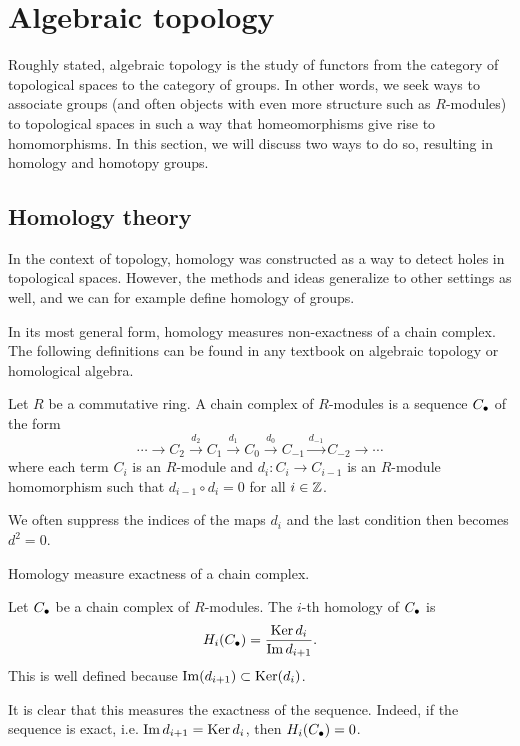 \section*{Algebraic topology}

Roughly stated, algebraic topology is the study of functors from the category of topological spaces to the category of groups.
In other words, we seek ways to associate groups (and often objects with even more structure such as $R$-modules) to topological spaces in such a way that homeomorphisms give rise to homomorphisms.
In this section, we will discuss two ways to do so, resulting in homology and homotopy groups.

\subsection*{Homology theory}

In the context of topology, homology was constructed as a way to detect holes in topological spaces.
However, the methods and ideas generalize to other settings as well, and we can for example define homology of groups.

In its most general form, homology measures non-exactness of a chain complex.
The following definitions can be found in any textbook on algebraic topology or homological algebra.

\begin{definition}
    Let $R$ be a commutative ring.
    A chain complex of $R$-modules is a sequence $C_\bullet$ of the form
    \[
    \cdots \to  C_2 \xrightarrow{d_2}  C_1 \xrightarrow{d_1} C_0 \xrightarrow{d_0} C_{-1} \xrightarrow{d_{-1}}   C_{-2} \to  \cdots
    \] 
    where each term $C_i$ is an $R$-module and $d_i: C_i \to  C_{i-1}$ is an $R$-module homomorphism such that $d_{i-1}  \circ  d_i = 0$  for all $i \in \mathbb{Z}$.
\end{definition}
We often suppress the indices of the maps $d_i$ and the last condition then becomes $d^2 = 0$.

\begin{marginfigure}
    \centering
    \caption{Homology measure exactness of a chain complex.}
    \label{fig:homology-definition}
\end{marginfigure}

\begin{definition}[Homology]
    Let $C_\bullet$ be a chain complex of  $R$-modules. The $i$-th homology of $C_\bullet$ is
     \[
         H_i(C_\bullet) = \frac{\operatorname{Ker} d_i}{\operatorname{Im} d_{i+1}}
    .\] 
    This is well defined because $\operatorname{Im}(d_{i+1}) \subset \operatorname{Ker} (d_i)$.
\end{definition}
It is clear that this measures the exactness of the sequence. Indeed, if the sequence is exact, i.e. $\operatorname{Im} d_{i+1} = \operatorname{Ker} d_i$, then $H_i(C_\bullet) = 0$.

